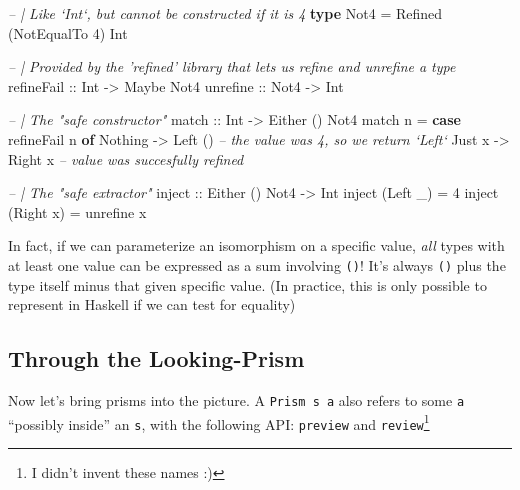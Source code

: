 \documentclass[]{article}
\newenvironment{Shaded}{}{}
\newcommand{\CommentTok}[1]{\textcolor[rgb]{0.38,0.63,0.69}{\textit{#1}}}
\newcommand{\DataTypeTok}[1]{\textcolor[rgb]{0.56,0.13,0.00}{#1}}
\newcommand{\DecValTok}[1]{\textcolor[rgb]{0.25,0.63,0.44}{#1}}
\newcommand{\FunctionTok}[1]{\textcolor[rgb]{0.02,0.16,0.49}{#1}}
\newcommand{\KeywordTok}[1]{\textcolor[rgb]{0.00,0.44,0.13}{\textbf{#1}}}
\newcommand{\NormalTok}[1]{#1}
\newcommand{\OtherTok}[1]{\textcolor[rgb]{0.00,0.44,0.13}{#1}}
\begin{document}
\begin{Shaded}
\begin{Highlighting}[]
\CommentTok{-- | Like `Int`, but cannot be constructed if it is 4}
\KeywordTok{type} \DataTypeTok{Not4} \FunctionTok{=} \DataTypeTok{Refined}\NormalTok{ (}\DataTypeTok{NotEqualTo} \DecValTok{4}\NormalTok{) }\DataTypeTok{Int}

\CommentTok{-- | Provided by the 'refined' library that lets us refine and unrefine a type}
\OtherTok{refineFail ::} \DataTypeTok{Int}  \OtherTok{->} \DataTypeTok{Maybe} \DataTypeTok{Not4}
\OtherTok{unrefine   ::} \DataTypeTok{Not4} \OtherTok{->} \DataTypeTok{Int}


\CommentTok{-- | The "safe constructor"}
\OtherTok{match ::} \DataTypeTok{Int} \OtherTok{->} \DataTypeTok{Either}\NormalTok{ () }\DataTypeTok{Not4}
\NormalTok{match n }\FunctionTok{=} \KeywordTok{case}\NormalTok{ refineFail n }\KeywordTok{of}
    \DataTypeTok{Nothing} \OtherTok{->} \DataTypeTok{Left}\NormalTok{ ()          }\CommentTok{-- the value was 4, so we return `Left`}
    \DataTypeTok{Just}\NormalTok{ x  }\OtherTok{->} \DataTypeTok{Right}\NormalTok{ x          }\CommentTok{-- value was succesfully refined}

\CommentTok{-- | The "safe extractor"}
\OtherTok{inject ::} \DataTypeTok{Either}\NormalTok{ () }\DataTypeTok{Not4} \OtherTok{->} \DataTypeTok{Int}
\NormalTok{inject (}\DataTypeTok{Left}\NormalTok{  _) }\FunctionTok{=} \DecValTok{4}
\NormalTok{inject (}\DataTypeTok{Right}\NormalTok{ x) }\FunctionTok{=}\NormalTok{ unrefine x}
\end{Highlighting}
\end{Shaded}

In fact, if we can parameterize an isomorphism on a specific value, \emph{all}
types with at least one value can be expressed as a sum involving \texttt{()}!
It's always \texttt{()} plus the type itself minus that given specific value.
(In practice, this is only possible to represent in Haskell if we can test for
equality)

\hypertarget{through-the-looking-prism}{%
\subsection{Through the Looking-Prism}\label{through-the-looking-prism}}

Now let's bring prisms into the picture. A
\texttt{Prism\textquotesingle{}\ s\ a} also refers to some \texttt{a} ``possibly
inside'' an \texttt{s}, with the following API: \texttt{preview} and
\texttt{review}\footnote{I didn't invent these names :)}
\end{document}
